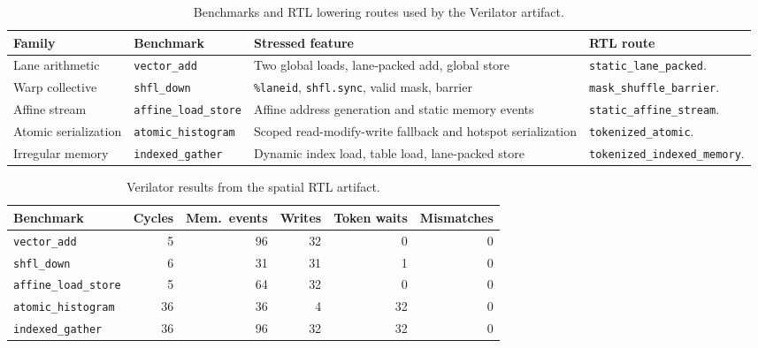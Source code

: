 \documentclass[sigplan,nonacm]{acmart}
\begin{document}
\begin{table}[t]
\centering
\caption{Benchmarks and RTL lowering routes used by the Verilator artifact.}
\label{tab:benchmarks}
\small
\begin{tabular}{p{}p{}p{}p{}}
\toprule
Family & Benchmark & Stressed feature & RTL route \\
\midrule
Lane arithmetic &
\texttt{vector\_add} &
Two global loads, lane-packed add, global store &
\texttt{static\_lane\_packed}. \\
Warp collective &
\texttt{shfl\_down} &
\texttt{\%laneid}, \texttt{shfl.sync}, valid mask, barrier &
\texttt{mask\_shuffle\_barrier}. \\
Affine stream &
\texttt{affine\_load\_store} &
Affine address generation and static memory events &
\texttt{static\_affine\_stream}. \\
Atomic serialization &
\texttt{atomic\_histogram} &
Scoped read-modify-write fallback and hotspot serialization &
\texttt{tokenized\_atomic}. \\
Irregular memory &
\texttt{indexed\_gather} &
Dynamic index load, table load, lane-packed store &
\texttt{tokenized\_indexed\_memory}. \\
\bottomrule
\end{tabular}
\end{table}

\begin{table}[t]
\centering
\caption{Verilator results from the spatial RTL artifact.}
\label{tab:verilator}
\small
\begin{tabular}{lrrrrr}
\toprule
Benchmark & Cycles & Mem.\ events & Writes & Token waits & Mismatches \\
\midrule
\texttt{vector\_add} & 5 & 96 & 32 & 0 & 0 \\
\texttt{shfl\_down} & 6 & 31 & 31 & 1 & 0 \\
\texttt{affine\_load\_store} & 5 & 64 & 32 & 0 & 0 \\
\texttt{atomic\_histogram} & 36 & 36 & 4 & 32 & 0 \\
\texttt{indexed\_gather} & 36 & 96 & 32 & 32 & 0 \\
\bottomrule
\end{tabular}
\end{table}
\end{document}
